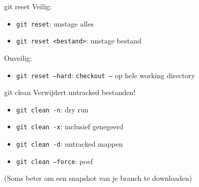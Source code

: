 \begin{frame}{git reset}
	Veilig:
	\begin{itemize}
		\item \texttt{git reset}: unstage alles
		\item \texttt{git reset <bestand>}: unstage bestand
	\end{itemize}
	\alert{Onveilig:}
	\begin{itemize}
		\item \texttt{git reset --hard}: \texttt{checkout --} op hele working directory
	\end{itemize}
\end{frame}

\begin{frame}{git clean}
	\alert{Verwijdert untracked bestanden!}
	\begin{itemize}
		\item \texttt{git clean -n}: dry run
		\item \texttt{git clean -x}: inclusief genegeerd
		\item \texttt{git clean -d}: untracked mappen
		\item \texttt{git clean --force}: \alert{poef}
	\end{itemize}
	(Soms beter om een snapshot van je branch te downloaden)
\end{frame}

